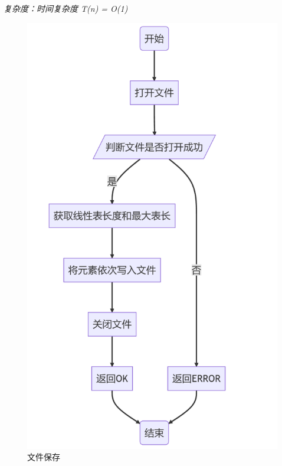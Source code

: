 \documentclass[supercite]{Experimental_Report}
\theoremstyle{definition}
\begin{document}
\begin{enumerate}
	\emph{复杂度：时间复杂度 T(n) = O(1)}
\begin{figure}[H]
	\centering
	\begin{minipage}{0.7\linewidth}
		\centering
		\includegraphics[width=0.9\linewidth]{images/文件保存.png}
	\end{minipage}
	\caption{文件保存}
	\label{fig2-5}
\end{figure}


\end{enumerate}
\end{document}
